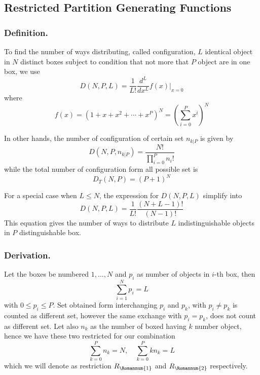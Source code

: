 \documentclass[../../main.tex]{subfiles}
\begin{document}
\subsection*{Restricted Partition Generating Functions}
\subsubsection*{Definition.} To find the number of ways distributing, called configuration, $L$ identical object in $N$ distinct boxes subject to condition that not more that $P$ object are in one box, we use 
\begin{equation*}
    D(N,P,L)=\frac{1}{L!}\frac{d^L}{dx^L}f(x)\bigg|_{x=0}
\end{equation*}
where
\begin{equation*}
    f(x)=\left(1+x+x^2+\cdots+ x^P\right)^N=\left(\sum^{P }_{i=0}x^i\right)^N
\end{equation*}

In other hands, the number of configuration of certain set $n_{k|P}$ is given by 
\begin{equation*}
    D(N,P,n_{k|P})=\frac{N!}{\displaystyle\prod_{i=0}^{P}n_i!}
\end{equation*}
while the total number of configuration form all possible set is 
\begin{equation*}
    D_T(N,P)=(P+1)^N
\end{equation*}

For a special case when $L\leq N$, the expression for $D(N,P,L)$ simplify into 
\begin{equation*}
    D(N,P,L)=\frac{1}{L!}\frac{(N+L-1)!}{(N-1)!}
\end{equation*}
This equation gives the number of ways to distribute $L$ indistinguishable objects in $P$ distinguishable box.

\subsubsection*{Derivation.} Let the boxes be numbered $1,\dots, N$ and $p_i$ as number of objects in $i$-th box, then 
\begin{equation*}
    \sum_{i=1}^{N}p_i=L
\end{equation*}
with $0\leq p_i\leq P$. Set obtained form interchanging $p_i$ and $p_k$, with $p_i\neq p_k$ is counted as different set, however the same exchange with $p_i=p_k$, does not count as different set. Let also $n_k$ as the number of boxed having $k$ number object, hence we have these two restricted for our combination
\begin{equation*}
    \sum_{k=0}^{P}n_k=N,\quad\sum_{k=0 }^{P }kn_k=L
\end{equation*}
which we will denote as restriction $R_\Romannum{1}$ and $R_\Romannum{2}$ respectively.
\end{document}
